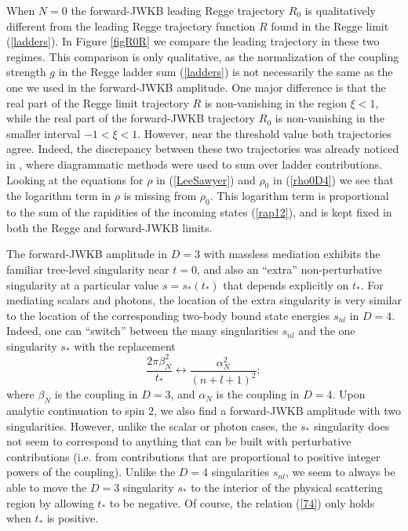 When $N = 0$ the forward-JWKB leading Regge trajectory $R_{0}$ is qualitatively different from the leading Regge trajectory function $R$ found in the Regge limit (\ref{ladders}). In Figure \ref{figR0R} we compare the leading trajectory in these two regimes. This comparison is only qualitative, as the normalization of the coupling strength $g$ in the Regge ladder sum (\ref{ladders}) is not necessarily the same as the one we used in the forward-JWKB amplitude. One major difference is that the real part of the Regge limit trajectory $R$ is non-vanishing in the region $\xi < 1$, while the real part of the forward-JWKB trajectory $R_{0}$ is non-vanishing in the smaller interval $-1 < \xi < 1$. However, near the threshold value both trajectories agree. Indeed, the discrepancy between these two trajectories was already noticed in \cite{Levy:1970yn}, where diagrammatic methods were used to sum over ladder contributions. Looking at the equations for $\rho$ in (\ref{LeeSawyer}) and $\rho_{0}$ in (\ref{rho0D4}) we see that the logarithm term in $\rho$ is missing from $\rho_{0}$. This logarithm term is proportional to the sum of the rapidities of the incoming states (\ref{rap12}), and is kept fixed in both the Regge and forward-JWKB limits. 

The forward-JWKB amplitude in $D = 3$ with massless mediation exhibits the familiar tree-level singularity near $t = 0$, and also an ``extra'' non-perturbative singularity at a particular value $s = s_{*}(t_{*})$ that depends explicitly on $t_{*}$. For mediating scalars and photons, the location of the extra singularity is very similar to the location of the corresponding two-body bound state energies $s_{nl}$ in $D = 4$. Indeed, one can ``switch'' between the many singularities $s_{nl}$ and the one singularity $s_{*}$ with the replacement
\begin{equation}
	\frac{2 \pi \beta^{2}_{N}}{t_{*}} \longleftrightarrow \frac{\alpha^{2}_{N}}{(n + l + 1)^{2}};
	\label{74}
\end{equation}
where $\beta_{N}$ is the coupling in $D = 3$, and $\alpha_{N}$ is the coupling in $D = 4$. Upon analytic continuation to spin $2$, we also find a forward-JWKB amplitude with two singularities. However, unlike the scalar or photon cases, the $s_{*}$ singularity does not seem to correspond to anything that can be built with perturbative contributions (i.e. from contributions that are proportional to positive integer powers of the coupling). Unlike the $D = 4$ singularities $s_{nl}$, we seem to always be able to move the $D = 3$ singularity $s_{*}$ to the interior of the physical scattering region by allowing $t_{*}$ to be negative. Of course, the relation (\ref{74}) only holds when $t_{*}$ is positive.

